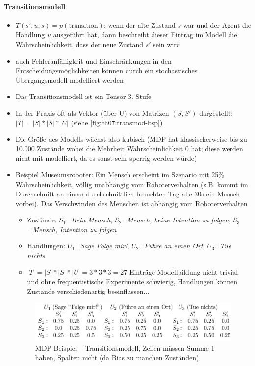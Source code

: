 \paragraph{Transitionsmodell}
\begin{itemize}
	\item $T(s', u, s) = p(\text{transition})$: wenn der alte Zustand $s$ war und der Agent die Handlung $u$ ausgef\"uhrt hat, dann beschreibt dieser Eintrag im Modell die Wahrscheinlichkeit, dass 			der neue Zustand $s'$ sein wird
	\item auch Fehleranfälligkeit und Einschränkungen in den Entscheidungsmöglichkeiten können durch ein stochastisches Übergangsmodell modelliert werden
	\item Das Transitionsmodell ist ein Tensor 3. Stufe
	\item In der Praxis oft als Vektor (\"uber U) von Matrizen $(S, S')$ dargestellt: $|T| = |S| * |S| * |U|$ (siehe \autoref{fig:ch07:transmod-bsp})
	\item Die Gr\"o{\ss}e des Modells w\"achst also kubisch (MDP hat klassischerweise bis zu 10.000 Zustände wobei die Mehrheit Wahrscheinlichkeit 0 hat; diese werden nicht mit modelliert, da es 				sonst sehr sperrig werden würde)
	\item Beispiel Museumsroboter: Ein Mensch erscheint im Szenario mit 25\% Wahrscheinlichkeit, völlig unabhängig vom Roboterverhalten (z.B. kommt im Durchschnitt an einem durchschnittlich besuchten  		Tag alle 30s ein Mensch vorbei). Das Verschwinden des Menschen ist abhängig vom Roboterverhalten
	\begin{itemize}
		\item Zustände: $S_1$=\textit{Kein Mensch}, $S_2$=\textit{Mensch, keine Intention zu folgen}, $S_3$=\textit{Mensch, Intention zu folgen} 
		\item Handlungen: $U_1$=\textit{Sage \glqq Folge mir!\grqq}, $U_2$=\textit{Führe an einen Ort}, $U_3$=\textit{Tue nichts}
		\item $|T| = |S| * |S| * |U| = 3*3*3=27$ Einträge
		\ita Modellbildung nicht trivial und ohne frequentistische Experimente schwierig, Handlungen können Zustände verschiedenartig beeinflussen...
	\end{itemize}
	\begin{figure}[!h]
		\centering
  		\includegraphics[width=0.6\linewidth]{figures/ch07_transmod-bsp.png}
		\caption{MDP Beispiel -- Transitionsmodell, Zeilen müssen Summe 1 haben, Spalten nicht (da Bias zu manchen Zuständen)}
		\label{fig:ch07:transmod-bsp}
	\end{figure}
\end{itemize}

